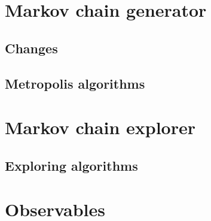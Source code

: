 \documentclass[a4paper, 12pt]{article}
\def\buildMode{buildmissing}
\begin{document}
    \begin{landscape}
    \section{Markov chain generator}

        \subsection{Changes}
        \begin{figure}[htb]
            \centering
            
            \caption{}
        \end{figure}
        \clearpage

        \subsection{Metropolis algorithms}
        \begin{figure}[htb]
            \centering
            
            \caption{}
        \end{figure}
        \clearpage

    \section{Markov chain explorer}

        \subsection{Exploring algorithms}
        \begin{figure}[htb]
            \centering
            
            \caption{}
        \end{figure}
        \clearpage

    \section{Observables}
        \begin{figure}[htb]
            \centering
            
            \caption{}
        \end{figure}
    \end{landscape}

    \nocite{*}
    \printbibliography
\end{document}
